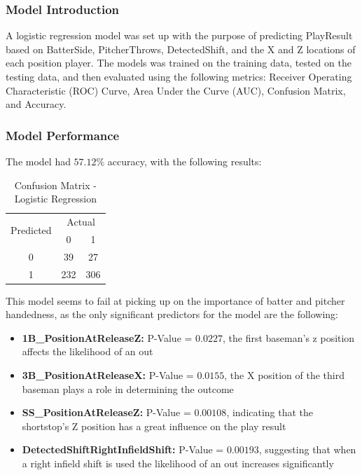 \documentclass{article}
\begin{document}
\subsubsection{Model Introduction}
A logistic regression model was set up with the purpose of predicting PlayResult
based on BatterSide, PitcherThrows, DetectedShift, and the X and Z locations of each position player. The models was trained on the training data, tested on the testing data, and then evaluated using the following metrics: Receiver Operating Characteristic (ROC) Curve, Area Under the Curve (AUC), Confusion Matrix, and Accuracy. 

\subsubsection{Model Performance}
The model had $57.12\%$ accuracy, with the following results: 

\begin{table}[h!]
\centering
\begin{tabular}{|c|c|c|}
\hline
\multirow{2}{*}{Predicted} & \multicolumn{2}{c|}{Actual} \\ \cline{2-3} 
                           & 0   & 1   \\ \hline
0                          & 39  & 27  \\ \hline
1                          & 232 & 306 \\ \hline
\end{tabular}
\caption{Confusion Matrix - Logistic Regression}
\end{table}

This model seems to fail at picking up on the importance of batter and pitcher handedness, as the only significant predictors for the model are the following: 
\begin{itemize}
    \item \textbf{1B\_PositionAtReleaseZ:} P-Value = $0.0227$, the first baseman's z position affects the likelihood of an out
    \item \textbf{3B\_PositionAtReleaseX:} P-Value = $0.0155$, the X position of the third baseman plays a role in determining the outcome 
    \item \textbf{SS\_PositionAtReleaseZ:} P-Value = $0.00108$, indicating that the shortstop's Z position has a great influence on the play result 
    \item \textbf{DetectedShiftRightInfieldShift:} P-Value = $0.00193$, suggesting that when a right infield shift is used the likelihood of an out increases significantly 
\end{itemize}
\end{document}
